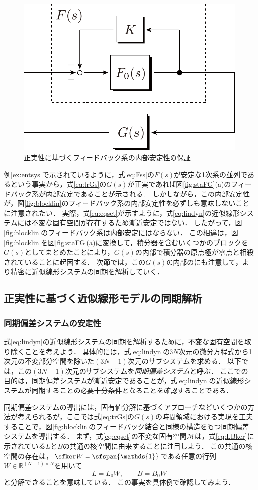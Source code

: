 \documentclass[a4j,10pt,oneside,openany,dvipdfmx]{jsbook}
\begin{document}
\begin{figure}[t]
\centering
\includegraphics[width = .35\linewidth]{figs/Fdec}
\caption{正実性に基づくフィードバック系の内部安定性の保証}
\label{fig:Fdec}
\end{figure}

例\ref{ex:entsys}で示されているように，式\eqref{eq:Fss}の$F(s)$が安定な1次系の並列であるという事実から，式\eqref{eq:trGs}の$G(s)$が正実であれば図\ref{fig:staFG}(a)のフィードバック系が内部安定であることが示される．
しかしながら，この内部安定性が，図\ref{fig:blocklin}のフィードバック系の内部安定性を必ずしも意味しないことに注意されたい．
実際，式\eqref{eq:eqset}が示すように，式\eqref{eq:lindyn}の近似線形システムには不変な固有空間が存在するため漸近安定ではない．
したがって，図\ref{fig:blocklin}のフィードバック系は内部安定にはならない．
この相違は，図\ref{fig:blocklin}を図\ref{fig:staFG}(a)に変換して，積分器を含むいくつかのブロックを$G(s)$としてまとめたことにより，$G(s)$の内部で積分器の原点極が零点と相殺されていることに起因する．
次節では，この$G(s)$の内部のにも注意して，より精密に近似線形システムの同期を解析していく．

\subsection{正実性に基づく近似線形モデルの同期解析}\label{sec:syncanp}

\subsubsection{同期偏差システムの安定性}

式\eqref{eq:lindyn}の近似線形システムの同期を解析するために，不変な固有空間を取り除くことを考えよう．
具体的には，式\eqref{eq:lindyn}の$3N$次元の微分方程式から1次元の不変部分空間を除いた$(3N-1)$次元のサブシステムを求める．
以下では，この$(3N-1)$次元のサブシステムを\emph{同期偏差システム}と呼ぶ．
ここでの目的は，同期偏差システムが漸近安定であることが，式\eqref{eq:lindyn}の近似線形システムが同期することの必要十分条件となることを確認することである．


同期偏差システムの導出には，固有値分解に基づくアプローチなどいくつかの方法が考えられるが，ここでは式\eqref{eq:trGs}の$G(s)$の時間領域における実現を工夫することで，図\ref{fig:blocklin}のフィードバック結合と同様の構造をもつ同期偏差システムを導出する．
まず，式\eqref{eq:eqset}の不変な固有空間$\mathcal{M}$は，式\eqref{eq:LBker}に示されている$L$と$B$の共通の核空間に由来することに注目しよう．
この共通の核空間の存在は，$\sfker W = \sfspan\{ \mathds{1}\}$である任意の行列$W \in \mathbb{R}^{(N-1)\times N}$を用いて
\begin{equation}\label{eq:decLB}
L = L_0 W 
,\qquad
B = B_0 W 
\end{equation}
と分解できることを意味している．
この事実を具体例で確認してみよう．
\end{document}
